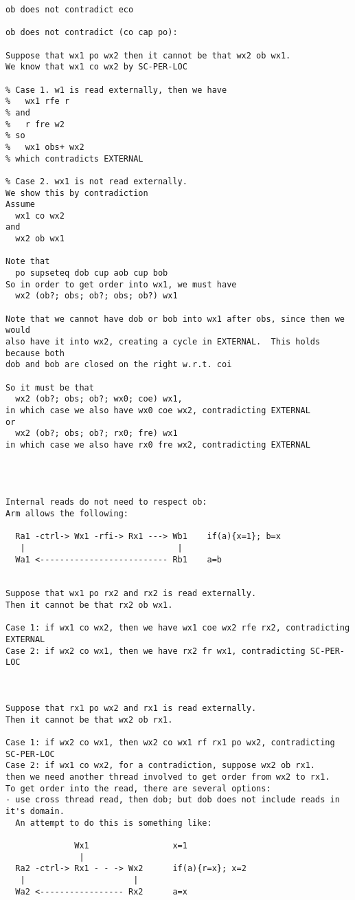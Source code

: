 \begin{verbatim}
ob does not contradict eco

ob does not contradict (co cap po):

Suppose that wx1 po wx2 then it cannot be that wx2 ob wx1.
We know that wx1 co wx2 by SC-PER-LOC

% Case 1. w1 is read externally, then we have
%   wx1 rfe r
% and
%   r fre w2
% so
%   wx1 obs+ wx2
% which contradicts EXTERNAL

% Case 2. wx1 is not read externally.
We show this by contradiction
Assume
  wx1 co wx2
and
  wx2 ob wx1

Note that
  po supseteq dob cup aob cup bob
So in order to get order into wx1, we must have
  wx2 (ob?; obs; ob?; obs; ob?) wx1

Note that we cannot have dob or bob into wx1 after obs, since then we would
also have it into wx2, creating a cycle in EXTERNAL.  This holds because both
dob and bob are closed on the right w.r.t. coi

So it must be that 
  wx2 (ob?; obs; ob?; wx0; coe) wx1, 
in which case we also have wx0 coe wx2, contradicting EXTERNAL
or 
  wx2 (ob?; obs; ob?; rx0; fre) wx1
in which case we also have rx0 fre wx2, contradicting EXTERNAL




Internal reads do not need to respect ob:
Arm allows the following:

  Ra1 -ctrl-> Wx1 -rfi-> Rx1 ---> Wb1    if(a){x=1}; b=x
   |                               |
  Wa1 <-------------------------- Rb1    a=b


Suppose that wx1 po rx2 and rx2 is read externally.
Then it cannot be that rx2 ob wx1.

Case 1: if wx1 co wx2, then we have wx1 coe wx2 rfe rx2, contradicting EXTERNAL
Case 2: if wx2 co wx1, then we have rx2 fr wx1, contradicting SC-PER-LOC



Suppose that rx1 po wx2 and rx1 is read externally.
Then it cannot be that wx2 ob rx1.

Case 1: if wx2 co wx1, then wx2 co wx1 rf rx1 po wx2, contradicting SC-PER-LOC 
Case 2: if wx1 co wx2, for a contradiction, suppose wx2 ob rx1.
then we need another thread involved to get order from wx2 to rx1.
To get order into the read, there are several options:
- use cross thread read, then dob; but dob does not include reads in it's domain.
  An attempt to do this is something like:

              Wx1                 x=1
               |
  Ra2 -ctrl-> Rx1 - - -> Wx2      if(a){r=x}; x=2
   |                      |
  Wa2 <----------------- Rx2      a=x


\end{verbatim}

